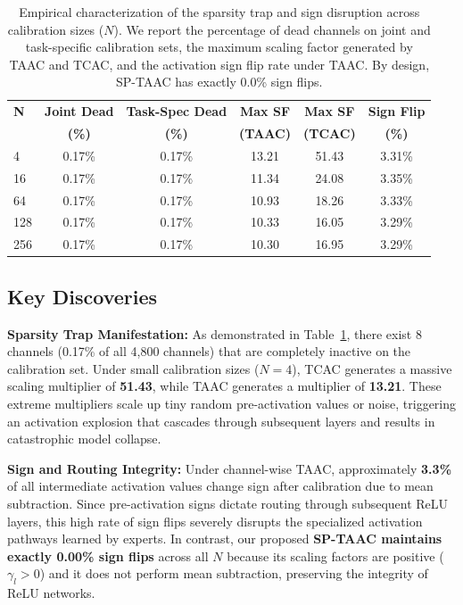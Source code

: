 \documentclass{article}
\theoremstyle{plain}
\theoremstyle{definition}
\theoremstyle{remark}
\begin{document}
\begin{table}[ht]
\caption{Empirical characterization of the sparsity trap and sign disruption across calibration sizes ($N$). We report the percentage of dead channels on joint and task-specific calibration sets, the maximum scaling factor generated by TAAC and TCAC, and the activation sign flip rate under TAAC. By design, SP-TAAC has exactly 0.0\% sign flips.}
\label{tab:sparsity_trap_stats}
\begin{center}
\small
\begin{tabular}{l|cc|cc|c}
\toprule
\textbf{N} & \textbf{Joint Dead} & \textbf{Task-Spec Dead} & \textbf{Max SF} & \textbf{Max SF} & \textbf{Sign Flip} \\
 & \textbf{(\%)} & \textbf{(\%)} & \textbf{(TAAC)} & \textbf{(TCAC)} & \textbf{(\%)} \\
\midrule
4   & 0.17\% & 0.17\% & 13.21 & 51.43 & 3.31\% \\
16  & 0.17\% & 0.17\% & 11.34 & 24.08 & 3.35\% \\
64  & 0.17\% & 0.17\% & 10.93 & 18.26 & 3.33\% \\
128 & 0.17\% & 0.17\% & 10.33 & 16.05 & 3.29\% \\
256 & 0.17\% & 0.17\% & 10.30 & 16.95 & 3.29\% \\
\bottomrule
\end{tabular}
\end{center}
\end{table}

\subsection{Key Discoveries}

\textbf{Sparsity Trap Manifestation:} As demonstrated in Table~\ref{tab:sparsity_trap_stats}, there exist 8 channels (0.17\% of all 4,800 channels) that are completely inactive on the calibration set. Under small calibration sizes ($N=4$), TCAC generates a massive scaling multiplier of \textbf{51.43}, while TAAC generates a multiplier of \textbf{13.21}. These extreme multipliers scale up tiny random pre-activation values or noise, triggering an activation explosion that cascades through subsequent layers and results in catastrophic model collapse.

\textbf{Sign and Routing Integrity:} Under channel-wise TAAC, approximately \textbf{3.3\%} of all intermediate activation values change sign after calibration due to mean subtraction. Since pre-activation signs dictate routing through subsequent ReLU layers, this high rate of sign flips severely disrupts the specialized activation pathways learned by experts. In contrast, our proposed \textbf{SP-TAAC maintains exactly 0.00\% sign flips} across all $N$ because its scaling factors are positive ($\gamma_l > 0$) and it does not perform mean subtraction, preserving the integrity of ReLU networks.
\end{document}
